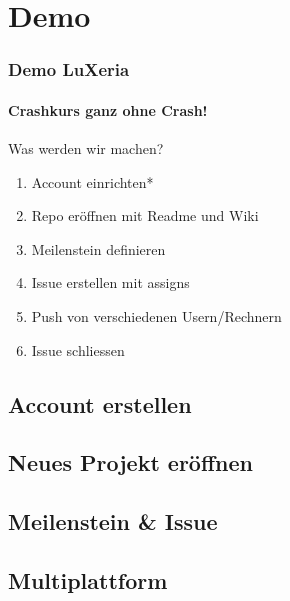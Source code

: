\section{Demo}
\begin{frame}
\end{frame}

\begin{frame}
    \frametitle{Demo \hfill{} \footnotesize{LuXeria}}
    \framesubtitle{Crashkurs ganz ohne Crash!}
    \begin{block}{Was werden wir machen?}
        \begin{enumerate}
            \item Account einrichten*
            \item Repo eröffnen mit Readme und Wiki
            \item Meilenstein definieren
            \item Issue erstellen mit assigns
            \item Push von verschiedenen Usern/Rechnern
            \item Issue schliessen
    \end{enumerate}
    \end{block}
\end{frame}

\subsection{Account erstellen}
\begin{frame}
\end{frame}

\subsection{Neues Projekt eröffnen}
\begin{frame}
\end{frame}

\subsection{Meilenstein \& Issue}
\begin{frame}
\end{frame}

\subsection{Multiplattform}
\begin{frame}
\end{frame}

